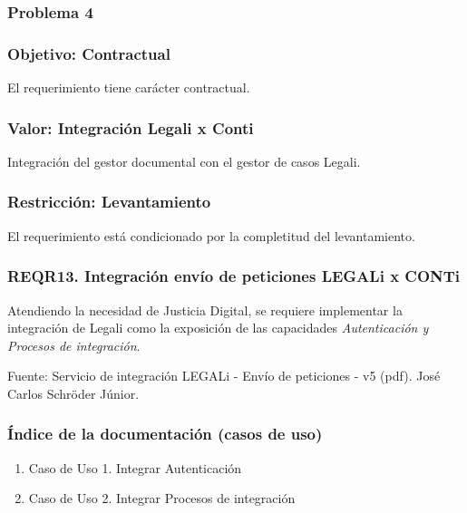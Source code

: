 \documentclass[
  paper=a4,
  ,captions=tableheading
]{scrartcl}
\providecommand{\tightlist}{%
  \setlength{\itemsep}{0pt}\setlength{\parskip}{0pt}}
\begin{document}
\subsubsection{Problema 4}\label{sec:problema-4}

\subsubsection{Objetivo: Contractual}\label{sec:objetivo-contractual-1}

El requerimiento tiene carácter contractual.

\subsubsection{Valor: Integración Legali x
Conti}\label{sec:valor-integraciuxf3n-legali-x-conti}

Integración del gestor documental con el gestor de casos Legali.

\subsubsection{Restricción:
Levantamiento}\label{sec:restricciuxf3n-levantamiento-1}

El requerimiento está condicionado por la completitud del levantamiento.

\subsubsection{REQR13. Integración envío de peticiones LEGALi x
CONTi}\label{sec:reqr13.-integraciuxf3n-envuxedo-de-peticiones-legali-x-conti}

Atendiendo la necesidad de Justicia Digital, se requiere implementar la
integración de Legali como la exposición de las capacidades
\emph{Autenticación y Procesos de integración}.

Fuente: Servicio de integración LEGALi - Envío de peticiones - v5 (pdf).
José Carlos Schröder Júnior.

\subsubsection{Índice de la documentación (casos de
uso)}\label{sec:uxedndice-de-la-documentaciuxf3n-casos-de-uso-2}

\begin{enumerate}
\def\labelenumi{\arabic{enumi}.}
\tightlist
\item
  Caso de Uso 1. Integrar Autenticación
\item
  Caso de Uso 2. Integrar Procesos de integración
\end{enumerate}
\end{document}

